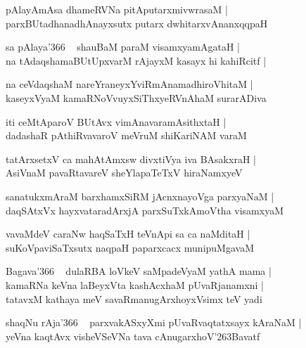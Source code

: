 \documentclass[twoside,12pt,openright]{book}
\def\S{\char'263}
\newcounter{shloka}[chapter]
\begin{document}
\begin{shloka}%
pAlayAmAsa dhameRVNa pitAputarxmivwrasaM |\\
parxBUtadhanadhAnayxsutx putarx dwhitarxvAnanxqqpaH
\end{shloka}

\begin{shloka}%
sa pAlaya\char'366 ~ shauBaM paraM visamxyamAgataH |\\
na tAdaqshamaBUtUpxvarM rAjayxM kasayx hi kahiRcitf |\\
\end{shloka}

\begin{shloka}%
na ceVdaqshaM nareYraneyxYviRmAnamadhiroVhitaM |\\
kaseyxVyaM kamaRNoVvuyxSiThxyeRVnAhaM surarADiva
\end{shloka}

\begin{shloka}%
iti ceMtAparoV BUtAvx vimAnavaramAsithxtaH |\\
dadashaR pAthiRvavaroV meVruM shiKariNAM varaM 
\end{shloka}

\begin{shloka}%
tatArxsetxV ca mahAtAmxsw divxtiVya iva BAsakxraH |\\
AsiVnaM pavaRtavareV sheYlapaTeTxV hiraNamxyeV 
\end{shloka}

\begin{shloka}%
sanatukxmAraM barxhamxSiRM jAcnxnayoVga parxyaNaM |\\
daqSAtxVx hayxvataradArxjA parxSuTxkAmoVtha visamxyaM 
\end{shloka}

\begin{shloka}%
vavaMdeV caraNw haqSaTxH teVnApi sa ca naMditaH |\\
suKoVpaviSaTxsutx naqpaH paparxcacx munipuMgavaM 
\end{shloka}

\begin{shloka}%
Bagava\char'366 ~ dulaRBA loVkeV saMpadeVyaM yathA mama |\\
kamaRNa keVna laBeyxVta kashAcxhaM pUvaRjanamxni |\\
tatavxM kathaya meV savaRmanugArxhoyxVsimx teV yadi
\end{shloka}

\begin{shloka}%
shaqNu rAja\char'366 ~ parxvakASxyXmi pUvaRvaqtatxsayx kAraNaM |\\
yeVna kaqtAvx visheVSeVNa tava cAnugarxhoV\S Bavatf
\end{shloka}
\end{document}
